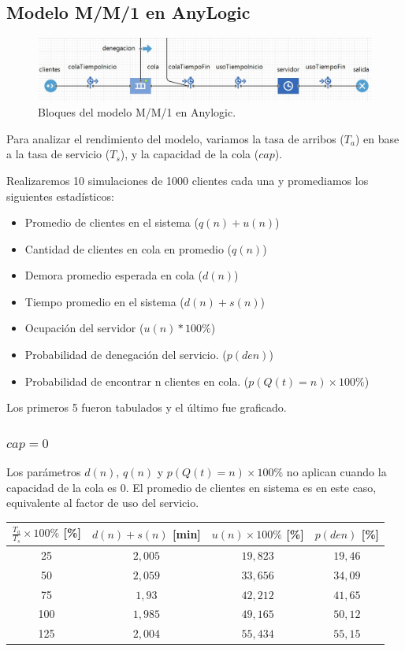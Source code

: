 \subsection{Modelo M/M/1 en AnyLogic}

\begin{figure}[H]
  \includegraphics[width=\linewidth]{images/anylogic-colas-modelo}
  \caption{Bloques del modelo M/M/1 en Anylogic.}
\end{figure}

Para analizar el rendimiento del modelo, variamos la tasa de arribos ($T_a$) en base a la tasa de servicio ($T_s$), y
la capacidad de la cola ($cap$).

Realizaremos 10 simulaciones de 1000 clientes cada una y promediamos los siguientes estadísticos:
\begin{itemize}
    \item Promedio de clientes en el sistema ($q(n)+u(n)$)
    \item Cantidad de clientes en cola en promedio ($q(n)$)
    \item Demora promedio esperada en cola ($d(n)$)
    \item Tiempo promedio en el sistema ($d(n)+s(n)$)
    \item Ocupación del servidor ($u(n)*100\%$)
    \item Probabilidad de denegación del servicio. ($p(den)$)
    \item Probabilidad de encontrar n clientes en cola. ($p(Q(t)=n)\times100\%$)
\end{itemize}

Los primeros 5 fueron tabulados y el último fue graficado.

\subsubsection[cap = 0]{$cap = 0$}

Los parámetros $d(n)$, $q(n)$ y $p(Q(t)=n)\times100\%$ no aplican cuando la capacidad de la cola es 0.
El promedio de clientes en sistema es en este caso, equivalente al factor de uso del servicio.

\begin{tabular}{||c||c|c|c||}
    \hline \hline
    $\frac{T_a}{T_s}\times100\%$ [\%] & $d(n)+s(n)$ [min] & $u(n)\times100\%$ [\%] & $p(den)$ [\%] \\
    \hline \hline
    25 & $2,005$ & $19,823$ & $19,46$ \\
    \hline
    50 & $2,059$ & $33,656$ & $34,09$ \\
    \hline
    75 & $1,93$ & $42,212$ & $41,65$ \\
    \hline
    100 & $1,985$ & $49,165$ & $50,12$ \\
    \hline
    125 & $2,004$ & $55,434$ & $55,15$ \\
    \hline \hline
\end{tabular}

